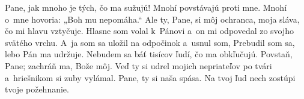 Pane, jak mnoho je tých, čo ma sužujú!
Mnohí povstávajú proti mne.
\versseparator
Mnohí o~mne hovoria:
„Boh mu nepomáha.“
\versseparator
Ale ty, Pane, si môj ochranca,
moja sláva, čo mi hlavu vztyčuje.
\versseparator
Hlasne som volal k~Pánovi
a~on mi odpovedal zo svojho svätého vrchu.
\versseparator
A~ja som sa uložil na odpočinok a~usnul som,
Prebudil som sa, lebo Pán ma udržuje.
\versseparator
Nebudem sa báť tisícov ľudí, čo ma obkľučujú.
Povstaň, Pane; zachráň ma, Bože môj.
\versseparator
Veď ty si udrel mojich nepriateľov po tvári
a~hriešnikom si zuby vylámal.
\versseparator
Pane, ty si naša spása.
Na tvoj ľud nech zostúpi tvoje požehnanie.
